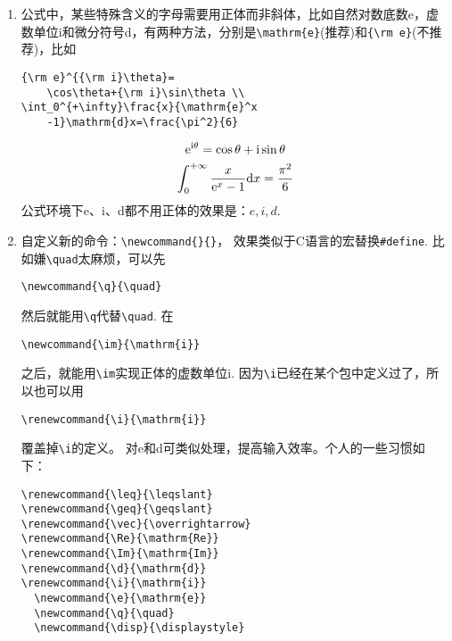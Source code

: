 \documentclass{article}
\newcommand{\q}{\quad}
\begin{document}
\begin{multicols}{2}
\begin{enumerate}
\item 公式中，某些特殊含义的字母需要用正体而非斜体，比如自然对数底数e，虚数单位i和微分符号d，有两种方法，分别是\verb|\mathrm{e}|(推荐)和\verb|{\rm e}|(不推荐)，比如
\begin{lstlisting}
{\rm e}^{{\rm i}\theta}=
    \cos\theta+{\rm i}\sin\theta \\
\int_0^{+\infty}\frac{x}{\mathrm{e}^x
    -1}\mathrm{d}x=\frac{\pi^2}{6}    
\end{lstlisting} 
\begin{gather*}
    {\rm e}^{{\rm i}\theta}=\cos\theta+{\rm i}\sin\theta \\
    \int_{0}^{+\infty}\dfrac{x}{\mathrm{e}^x
    -1}\mathrm{d}x=\dfrac{\pi^2}{6}
\end{gather*}
公式环境下e、i、d都不用正体的效果是：$ e,i,d $.

\item 自定义新的命令：\verb|\newcommand{}{}|，
效果类似于C语言的宏替换\verb|#define|. 
比如嫌\verb|\quad|太麻烦，可以先
\begin{lstlisting}
\newcommand{\q}{\quad}    
\end{lstlisting} 
然后就能用\verb|\q|代替\verb|\quad|. 
在
\begin{lstlisting}
\newcommand{\im}{\mathrm{i}}    
\end{lstlisting} 
之后，就能用\verb|\im|实现正体的虚数单位$ \mathrm{i} $.
因为\verb|\i|已经在某个包中定义过了，所以也可以用
\begin{lstlisting}
\renewcommand{\i}{\mathrm{i}}    
\end{lstlisting} 
覆盖掉\verb|\i|的定义。
对e和d可类似处理，提高输入效率。个人的一些习惯如下：
\begin{lstlisting}
\renewcommand{\leq}{\leqslant}
\renewcommand{\geq}{\geqslant} 
\renewcommand{\vec}{\overrightarrow}
\renewcommand{\Re}{\mathrm{Re}}
\renewcommand{\Im}{\mathrm{Im}}
\renewcommand{\d}{\mathrm{d}}
\renewcommand{\i}{\mathrm{i}} 
  \newcommand{\e}{\mathrm{e}}
  \newcommand{\q}{\quad}
  \newcommand{\disp}{\displaystyle}    
\end{lstlisting} 


\end{enumerate}
\end{multicols}
\end{document}
